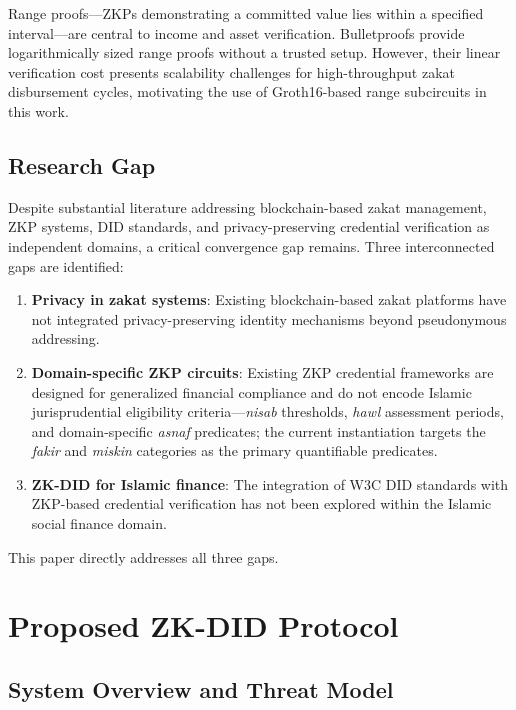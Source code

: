 \documentclass[conference]{IEEEtran}
\begin{document}
Range proofs---ZKPs demonstrating a committed value lies within a specified interval---are central to income and asset verification. Bulletproofs \cite{bunz2018} provide logarithmically sized range proofs without a trusted setup. However, their linear verification cost presents scalability challenges for high-throughput zakat disbursement cycles, motivating the use of Groth16-based range subcircuits in this work.

\subsection{Research Gap}

Despite substantial literature addressing blockchain-based zakat management, ZKP systems, DID standards, and privacy-preserving credential verification as independent domains, a critical convergence gap remains. Three interconnected gaps are identified:

\begin{enumerate}
    \item \textbf{Privacy in zakat systems}: Existing blockchain-based zakat platforms \cite{mustafa2021, khatiman2021, shalaby2023} have not integrated privacy-preserving identity mechanisms beyond pseudonymous addressing.
    \item \textbf{Domain-specific ZKP circuits}: Existing ZKP credential frameworks \cite{pauwels2021, camenisch2012} are designed for generalized financial compliance and do not encode Islamic jurisprudential eligibility criteria---\textit{nisab} thresholds, \textit{hawl} assessment periods, and domain-specific \textit{asnaf} predicates; the current instantiation targets the \textit{fakir} and \textit{miskin} categories as the primary quantifiable predicates.
    \item \textbf{ZK-DID for Islamic finance}: The integration of W3C DID standards with ZKP-based credential verification has not been explored within the Islamic social finance domain.
\end{enumerate}

This paper directly addresses all three gaps.

\section{Proposed ZK-DID Protocol}

\subsection{System Overview and Threat Model}
\end{document}
